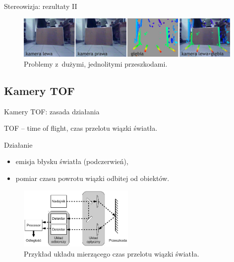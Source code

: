 \documentclass[xcolor=x11names,compress]{beamer}
\renewcommand{\(}{\begin{columns}}
\renewcommand{\)}{\end{columns}}
\newcommand{\<}[1]{\begin{column}{#1}}
\renewcommand{\>}{\end{column}}
\begin{document}
\begin{frame}{Stereowizja: rezultaty II}

    \begin{figure}[h!]
    \centering
    \includegraphics[width=11cm]{../Common/img/stereo_3}
    \caption{Problemy z~dużymi, jednolitymi przeszkodami.}
    \label{fig:stereo_3}
    \end{figure}

\end{frame}

\subsection{Kamery TOF}

\begin{frame}{Kamery TOF: zasada działania}

    \vspace{.5cm}

    \alert{TOF} -- time of flight, czas przelotu wiązki światła.

    \vspace{0.2cm}

    \alert{Działanie}
    \begin{itemize}
    \item emisja błysku światła (podczerwień),
    \item pomiar czasu powrotu wiązki odbitej od obiektów.
    \end{itemize}

    \begin{figure}[h!]
    \centering
    \includegraphics[height=3cm]{../Common/img/tof}
    \caption{Przykład układu mierzącego czas przelotu wiązki światła.}
    \label{fig:tof}
    \end{figure}

\end{frame}
\end{document}
